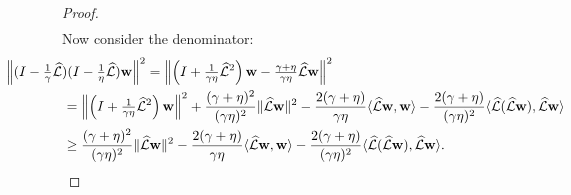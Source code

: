 \documentclass[a4paper,10pt]{article}
\begin{document}
{\begin{proof}
{\begin{align}
		\label{eq:num_gen}
\end{align}
}
%
Now consider the denominator:
%
\begin{align}
& \hspace{-10ex}
\left\|(I - \tfrac{1}{\gamma}\widehat{\mathcal{L}})(I - \tfrac{1}{\eta}\widehat{\mathcal{L}})\mathbf{w}\right\|^2
= \left\|\left(I + \tfrac{1}{\gamma\eta}\widehat{\mathcal{L}}^2\right)\mathbf{w} - 
	\tfrac{\gamma+\eta}{\gamma\eta}\widehat{\mathcal{L}}\mathbf{w}\right\|^2 \nonumber\\
& = \left\|\left(I + \tfrac{1}{\gamma\eta}\widehat{\mathcal{L}}^2\right)\mathbf{w}\right\|^2
	+ \frac{(\gamma+\eta)^2}{(\gamma\eta)^2}\|\widehat{\mathcal{L}}\mathbf{w}\|^2
	- \frac{2(\gamma+\eta)}{\gamma\eta}\langle \widehat{\mathcal{L}}\mathbf{w}, \mathbf{w}\rangle
	- \frac{2(\gamma+\eta)}{(\gamma\eta)^2}\langle \widehat{\mathcal{L}}(\widehat{\mathcal{L}}\mathbf{w}),
		\widehat{\mathcal{L}}\mathbf{w}\rangle \nonumber\\
& \geq \frac{(\gamma+\eta)^2}{(\gamma\eta)^2}\|\widehat{\mathcal{L}}\mathbf{w}\|^2
	- \frac{2(\gamma+\eta)}{\gamma\eta}\langle \widehat{\mathcal{L}}\mathbf{w}, \mathbf{w}\rangle
	- \frac{2(\gamma+\eta)}{(\gamma\eta)^2}\langle \widehat{\mathcal{L}}(\widehat{\mathcal{L}}\mathbf{w}),
		\widehat{\mathcal{L}}\mathbf{w}\rangle . \label{eq:den_gen}
\end{align}
%


\end{proof}}
\end{document}
